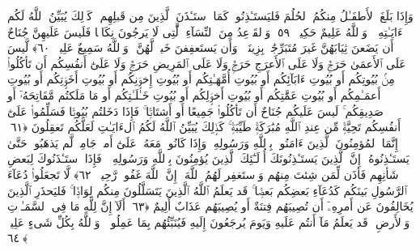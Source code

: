  وَإِذَا بَلَغَ ٱلأَطفَـٰلُ مِنكُمُ ٱلحُلُمَ فَليَستَـٔذِنُوا۟ كَمَا ٱستَـٔذَنَ ٱلَّذِينَ مِن قَبلِهِم ۚ كَذَٟلِكَ يُبَيِّنُ ٱللَّهُ لَكُم ءَايَـٰتِهِۦ ۗ وَٱللَّهُ عَلِيمٌ حَكِيمٌۭ ﴿٥٩﴾
 وَٱلقَوَٟعِدُ مِنَ ٱلنِّسَآءِ ٱلَّٰتِى لَا يَرجُونَ نِكَاحًۭا فَلَيسَ عَلَيهِنَّ جُنَاحٌ أَن يَضَعنَ ثِيَابَهُنَّ غَيرَ مُتَبَرِّجَٰتٍۭ بِزِينَةٍۢ ۖ وَأَن يَستَعفِفنَ خَيرٌۭ لَّهُنَّ ۗ وَٱللَّهُ سَمِيعٌ عَلِيمٌۭ ﴿٦٠﴾
 لَّيسَ عَلَى ٱلأَعمَىٰ حَرَجٌۭ وَلَا عَلَى ٱلأَعرَجِ حَرَجٌۭ وَلَا عَلَى ٱلمَرِيضِ حَرَجٌۭ وَلَا عَلَىٰٓ أَنفُسِكُم أَن تَأكُلُوا۟ مِنۢ بُيُوتِكُم أَو بُيُوتِ ءَابَآئِكُم أَو بُيُوتِ أُمَّهَـٰتِكُم أَو بُيُوتِ إِخوَٟنِكُم أَو بُيُوتِ أَخَوَٟتِكُم أَو بُيُوتِ أَعمَـٰمِكُم أَو بُيُوتِ عَمَّٰتِكُم أَو بُيُوتِ أَخوَٟلِكُم أَو بُيُوتِ خَـٰلَـٰتِكُم أَو مَا مَلَكتُم مَّفَاتِحَهُۥٓ أَو صَدِيقِكُم ۚ لَيسَ عَلَيكُم جُنَاحٌ أَن تَأكُلُوا۟ جَمِيعًا أَو أَشتَاتًۭا ۚ فَإِذَا دَخَلتُم بُيُوتًۭا فَسَلِّمُوا۟ عَلَىٰٓ أَنفُسِكُم تَحِيَّةًۭ مِّن عِندِ ٱللَّهِ مُبَٰرَكَةًۭ طَيِّبَةًۭ ۚ كَذَٟلِكَ يُبَيِّنُ ٱللَّهُ لَكُمُ ٱلءَايَـٰتِ لَعَلَّكُم تَعقِلُونَ ﴿٦١﴾
 إِنَّمَا ٱلمُؤمِنُونَ ٱلَّذِينَ ءَامَنُوا۟ بِٱللَّهِ وَرَسُولِهِۦ وَإِذَا كَانُوا۟ مَعَهُۥ عَلَىٰٓ أَمرٍۢ جَامِعٍۢ لَّم يَذهَبُوا۟ حَتَّىٰ يَستَـٔذِنُوهُ ۚ إِنَّ ٱلَّذِينَ يَستَـٔذِنُونَكَ أُو۟لَـٰٓئِكَ ٱلَّذِينَ يُؤمِنُونَ بِٱللَّهِ وَرَسُولِهِۦ ۚ فَإِذَا ٱستَـٔذَنُوكَ لِبَعضِ شَأنِهِم فَأذَن لِّمَن شِئتَ مِنهُم وَٱستَغفِر لَهُمُ ٱللَّهَ ۚ إِنَّ ٱللَّهَ غَفُورٌۭ رَّحِيمٌۭ ﴿٦٢﴾
 لَّا تَجعَلُوا۟ دُعَآءَ ٱلرَّسُولِ بَينَكُم كَدُعَآءِ بَعضِكُم بَعضًۭا ۚ قَد يَعلَمُ ٱللَّهُ ٱلَّذِينَ يَتَسَلَّلُونَ مِنكُم لِوَاذًۭا ۚ فَليَحذَرِ ٱلَّذِينَ يُخَالِفُونَ عَن أَمرِهِۦٓ أَن تُصِيبَهُم فِتنَةٌ أَو يُصِيبَهُم عَذَابٌ أَلِيمٌ ﴿٦٣﴾
 أَلَآ إِنَّ لِلَّهِ مَا فِى ٱلسَّمَـٰوَٟتِ وَٱلأَرضِ ۖ قَد يَعلَمُ مَآ أَنتُم عَلَيهِ وَيَومَ يُرجَعُونَ إِلَيهِ فَيُنَبِّئُهُم بِمَا عَمِلُوا۟ ۗ وَٱللَّهُ بِكُلِّ شَىءٍ عَلِيمٌۢ ﴿٦٤﴾
 
